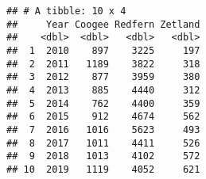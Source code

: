 \documentclass[
]{article}
\begin{document}
\begin{verbatim}
## # A tibble: 10 x 4
##     Year Coogee Redfern Zetland
##    <dbl>  <dbl>   <dbl>   <dbl>
##  1  2010    897    3225     197
##  2  2011   1189    3822     318
##  3  2012    877    3959     380
##  4  2013    885    4440     312
##  5  2014    762    4400     359
##  6  2015    912    4674     562
##  7  2016   1016    5623     493
##  8  2017   1011    4411     526
##  9  2018   1013    4102     572
## 10  2019   1119    4052     621
\end{verbatim}
\end{document}
